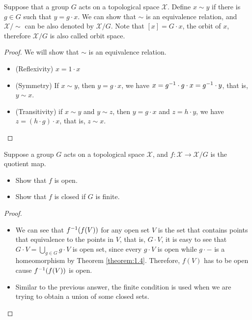 \documentclass[./main.tex]{subfiles}
\begin{document}
\begin{definition}
  Suppose that a group $G$ acts on a topological space $\mathcal{X}$.
  Define $x \sim y$ if there is $g \in G$ such that $y = g \cdot x$.
  We can show that $\sim$ is an equivalence relation, and $\mathcal{X}/\sim$
  can be also denoted by $\mathcal{X}/G$.
  Note that $[x] = G \cdot x$, the orbit of $x$, therefore $\mathcal{X}/G$
  is also called orbit space.
\end{definition}
\begin{proof}
  We will show that $\sim$ is an equivalence relation.
  \begin{itemize}
    \item (Reflexivity) $x = 1 \cdot x$
    \item (Symmetry) If $x \sim y$, then $y = g \cdot x$, we have $x = g^{-1} \cdot g \cdot x = g^{-1} \cdot y$,
          that is, $y \sim x$.
    \item (Transitivity) if $x \sim y$ and $y \sim z$, then $y = g \cdot x$ and $z = h \cdot y$,
          we have $z = (h \cdot g) \cdot x$, that is, $z \sim x$.
  \end{itemize}
\end{proof}

\begin{theorem}
  Suppose a group $G$ acts on a topological space $\mathcal{X}$,
  and $f : \mathcal{X} \rightarrow \mathcal{X}/G$ is the quotient map.
  \begin{itemize}
    \item Show that $f$ is open.
    \item Show that $f$ is closed if $G$ is finite.
  \end{itemize}
\end{theorem}
\begin{proof}
  ~
  \begin{itemize}
    \item We can see that $f^{-1}(f(V))$ for any open set $V$
          is the set that contains points that equivalence to the points in $V$,
          that is, $G \cdot V$, it is easy to see that $G \cdot V = \bigcup_{g \in G} g \cdot V$
          is open set, since every $g \cdot V$ is open while $g \cdot -$ is a homeomorphism by Theorem \ref{theorem:1.4}.
          Therefore, $f(V)$ has to be open cause $f^{-1}(f(V))$ is open.
    \item Similar to the previous answer, the finite condition is used when we
          are trying to obtain a union of some closed sets.
  \end{itemize}
\end{proof}
\end{document}
